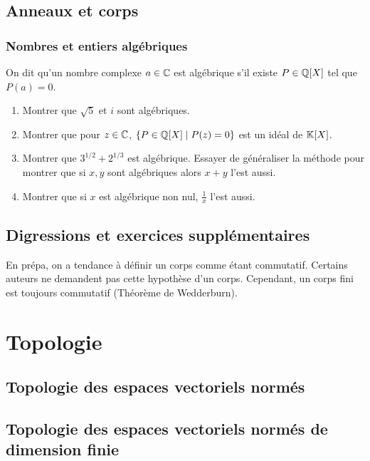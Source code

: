 \documentclass[12pt,a4paper]{exo_book}
\begin{document}
\section{Anneaux et corps}

\subsection{Nombres et entiers algébriques}

On dit qu'un nombre complexe $a \in \mathbb{C}$ est algébrique s'il existe $P \in \mathbb{Q} [X]$ tel que $P(a) = 0$.

\begin{exo}
    \begin{enumerate}
        \item Montrer que $\sqrt{5}$ et $i$ sont algébriques.
        \item Montrer que pour $z \in \mathbb{C}$, $\{P \in \mathbb{Q} [X] \mid P(z) = 0\}$ est un idéal de $\mathbb{K} [X]$.
        \item Montrer que $3^{1/2} + 2^{1/3}$ est algébrique. Essayer de généraliser la méthode pour montrer que si $x,y$ sont algébriques alors $x+y$ l'est aussi.
        \item Montrer que si $x$ est algébrique non nul, $\frac{1}{x}$ l'est aussi.
    \end{enumerate}
\end{exo}

\section{Digressions et exercices supplémentaires}

En prépa, on a tendance à définir un corps comme étant commutatif. Certains auteurs ne demandent pas cette hypothèse d'un corps. Cependant, un corps fini est toujours commutatif (Théorème de Wedderburn).



\chapter{Topologie}

\section{Topologie des espaces vectoriels normés}

\section{Topologie des espaces vectoriels normés de dimension finie}
\end{document}
